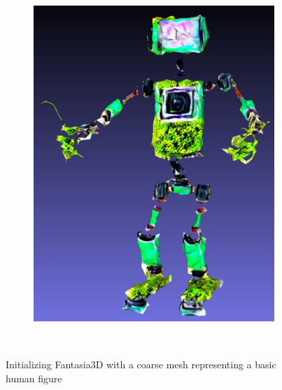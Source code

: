 \begin{figure}[ht]
\begin{subfigure}[b]{0.20\textwidth}
        \caption{}
    \end{subfigure}
    \begin{subfigure}[b]{0.37\textwidth}
        \centering
        \includegraphics[width=\textwidth]{figures/appendix/fantasia_plantrobot_model_resized.png}
        \caption{}
    \end{subfigure}
    \caption{Initializing Fantasia3D with a coarse mesh representing a basic human figure}~\label{fig:generationFantasia2}
\end{figure}



